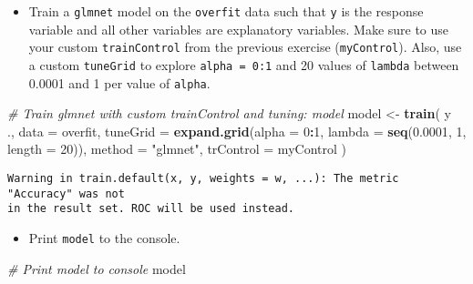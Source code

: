 \documentclass[
]{book}
\newenvironment{Shaded}{\begin{snugshade}}{\end{snugshade}}
\newcommand{\CommentTok}[1]{\textcolor[rgb]{0.56,0.35,0.01}{\textit{#1}}}
\newcommand{\DataTypeTok}[1]{\textcolor[rgb]{0.13,0.29,0.53}{#1}}
\newcommand{\DecValTok}[1]{\textcolor[rgb]{0.00,0.00,0.81}{#1}}
\newcommand{\FloatTok}[1]{\textcolor[rgb]{0.00,0.00,0.81}{#1}}
\newcommand{\KeywordTok}[1]{\textcolor[rgb]{0.13,0.29,0.53}{\textbf{#1}}}
\newcommand{\NormalTok}[1]{#1}
\newcommand{\OperatorTok}[1]{\textcolor[rgb]{0.81,0.36,0.00}{\textbf{#1}}}
\newcommand{\StringTok}[1]{\textcolor[rgb]{0.31,0.60,0.02}{#1}}
\providecommand{\tightlist}{%
  \setlength{\itemsep}{0pt}\setlength{\parskip}{0pt}}
\begin{document}
\begin{itemize}
\tightlist
\item
  Train a \texttt{glmnet} model on the \texttt{overfit} data such that \texttt{y} is the response variable and all other variables are explanatory variables. Make sure to use your custom \texttt{trainControl} from the previous exercise (\texttt{myControl}). Also, use a custom \texttt{tuneGrid} to explore \texttt{alpha\ =\ 0:1} and 20 values of \texttt{lambda} between 0.0001 and 1 per value of \texttt{alpha}.
\end{itemize}

\begin{Shaded}
\begin{Highlighting}[]
\CommentTok{# Train glmnet with custom trainControl and tuning: model}
\NormalTok{model <-}\StringTok{ }\KeywordTok{train}\NormalTok{(}
\NormalTok{  y }\OperatorTok{~}\StringTok{ }\NormalTok{., }\DataTypeTok{data =}\NormalTok{ overfit,}
  \DataTypeTok{tuneGrid =} \KeywordTok{expand.grid}\NormalTok{(}\DataTypeTok{alpha  =} \DecValTok{0}\OperatorTok{:}\DecValTok{1}\NormalTok{, }
                         \DataTypeTok{lambda =} \KeywordTok{seq}\NormalTok{(}\FloatTok{0.0001}\NormalTok{, }\DecValTok{1}\NormalTok{, }\DataTypeTok{length =} \DecValTok{20}\NormalTok{)),}
  \DataTypeTok{method =} \StringTok{"glmnet"}\NormalTok{,}
  \DataTypeTok{trControl =}\NormalTok{ myControl}
\NormalTok{)}
\end{Highlighting}
\end{Shaded}

\begin{verbatim}
Warning in train.default(x, y, weights = w, ...): The metric "Accuracy" was not
in the result set. ROC will be used instead.
\end{verbatim}

\begin{itemize}
\tightlist
\item
  Print \texttt{model} to the console.
\end{itemize}

\begin{Shaded}
\begin{Highlighting}[]
\CommentTok{# Print model to console}
\NormalTok{model}
\end{Highlighting}
\end{Shaded}
\end{document}
